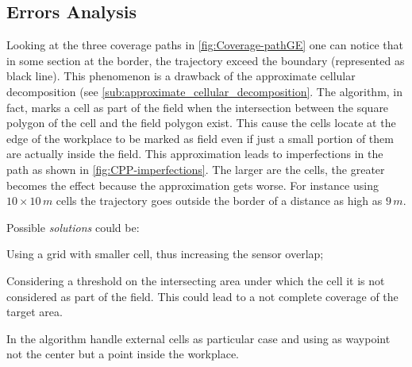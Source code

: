 \subsection{Errors Analysis} %
\label{sub:errors_analysis}
Looking at the three coverage paths in \autoref{fig:Coverage-pathGE} one can notice that in some section at the border, the trajectory exceed the boundary (represented as black line). This phenomenon is a drawback of the approximate cellular decomposition (see \autoref{sub:approximate_cellular_decomposition}. The algorithm, in fact, marks a cell as part of the field when the intersection between the square polygon of the cell and the field polygon
exist. This cause the cells locate at the edge of the workplace to be marked as field even if just a small portion of them are actually inside the field. This approximation leads to imperfections in the path as shown in \autoref{fig:CPP-imperfections}. The larger are the cells, the greater becomes the effect because the approximation gets worse. For instance using $10 \times 10\, m$ cells the trajectory goes outside the border of a distance as high as $9\, m$.\par
Possible \textit{solutions} could be:
 \begin{enumerate*}[label={(\arabic*)}]
	\item Using a grid with smaller cell, thus increasing the sensor overlap;
	\item Considering a threshold on the intersecting area under which the cell it is not considered as part of the field. This could lead to a not complete coverage of the target area.
	\item In the algorithm handle external cells as particular case and using as waypoint not the center but a point inside the workplace.
\end{enumerate*}

